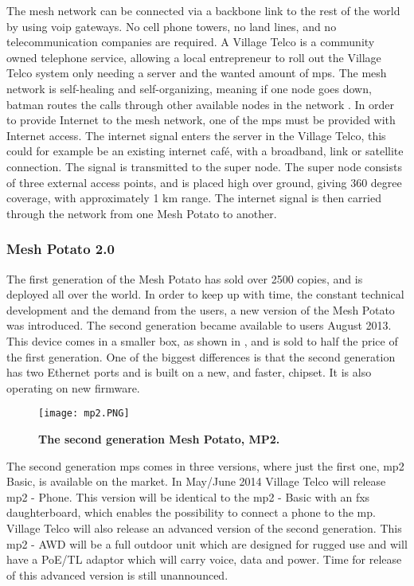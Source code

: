 The mesh network can be connected via a backbone link to the rest of the world by using \gls{voip} gateways. No cell phone towers, no land lines, and no telecommunication companies are required. A Village Telco is a community owned telephone service, allowing a local entrepreneur to roll out the Village Telco system only needing a server and the wanted amount of \glspl{mp}. The mesh network is self-healing and self-organizing, meaning if one node goes down, \gls{batman} routes the calls through other available nodes in the network \cite{MPbyRowe}. In order to provide Internet to the mesh network, one of the \glspl{mp} must be provided with Internet access. The internet signal enters the server in the Village Telco, this could for example be an existing internet café, with a broadband, link or satellite connection. The signal is transmitted to the super node. The super node consists of three external access points, and is placed high over ground, giving 360 degree coverage, with approximately 1 km range. The internet signal is then carried through the network from one Mesh Potato to another. 


\subsubsection{Mesh Potato 2.0}
The first generation of the Mesh Potato has sold over 2500 copies, and is deployed all over the world. In order to keep up with time, the constant technical development and the demand from the users, a new version of the Mesh Potato was introduced. The second generation became available to users August 2013. This device comes in a smaller box, as shown in , and is sold to half the price of the first generation. One of the biggest differences is that the second generation has two Ethernet ports and is built on a new, and faster, chipset. It is also operating on new firmware.

\begin{figure}[h!]
  \centering
      \texttt{[image: mp2.PNG]}
  \caption [MP2]{\textbf{The second generation Mesh Potato, MP2.}}
  \label{fig:MP02}
\end{figure}


The second generation \glspl{mp} comes in three versions, where just the first one, \gls{mp2} Basic, is available on the market. In May/June 2014 Village Telco will release \gls{mp2} - Phone. This version will be identical to the \gls{mp2} - Basic with an \gls{fxs} daughterboard, which enables the possibility to connect a phone to the \gls{mp}. Village Telco will also release an advanced version of the second generation. This \gls{mp2} - AWD will be a full outdoor unit which are designed for rugged use and will have a PoE/TL adaptor which will carry voice, data and power. Time for release of this advanced version is still unannounced. 


